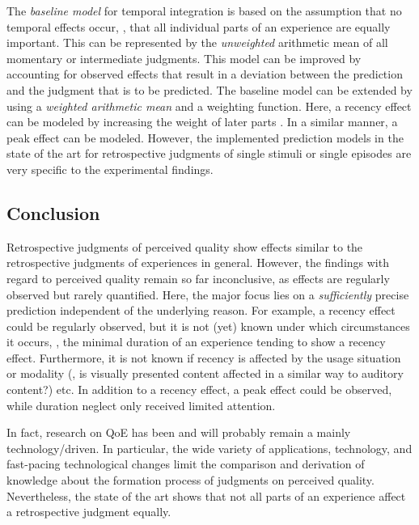 The \emph{baseline model} for temporal integration is based on the assumption that no temporal effects occur, \ie, that all individual parts of an experience are equally important.
This can be represented by the \emph{unweighted} arithmetic mean of all momentary or intermediate judgments.
This model can be improved by accounting for observed effects that result in a deviation between the prediction and the judgment that is to be predicted.
The baseline model can be extended by using a \emph{weighted arithmetic mean} and a weighting function.
Here, a recency effect can be modeled by increasing the weight of later parts \citep[][]{rosenbluth_testing_1998, weiss_modeling_2009, hamberg_time-varying_1999}.
In a similar manner, a peak effect can be modeled.
However, the implemented prediction models in the state of the art for retrospective judgments of single stimuli or single episodes are very specific to the experimental findings.

\subsection{Conclusion}
Retrospective judgments of perceived quality show effects similar to the retrospective judgments of experiences in general.
However, the findings with regard to perceived quality remain so far inconclusive, as effects are regularly observed but rarely quantified.
Here, the major focus lies on a \emph{sufficiently} precise prediction independent of the underlying reason.
For example, a recency effect could be regularly observed, but it is not (yet) known under which circumstances it occurs, \eg, the minimal duration of an experience tending to show a recency effect.
Furthermore, it is not known if recency is affected by the usage situation or modality (\eg, is visually presented content affected in a similar way to auditory content?) etc.
In addition to a recency effect, a peak effect could be observed, while duration neglect only received limited attention.

In fact, research on \ac{QoE} has been and will probably remain a mainly technology\-/driven.
In particular, the wide variety of applications, technology, and fast-pacing technological changes limit the comparison and derivation of knowledge about the formation process of judgments on perceived quality.
Nevertheless, the state of the art shows that not all parts of an experience affect a retrospective judgment equally.

